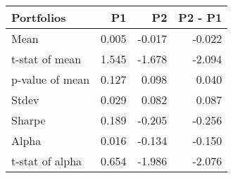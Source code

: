 \begin{tabular}{lrrr}
\toprule
Portfolios & P1 & P2 & P2 - P1 \\
\midrule
Mean & 0.005 & -0.017 & -0.022 \\
t-stat of mean & 1.545 & -1.678 & -2.094 \\
p-value of mean & 0.127 & 0.098 & 0.040 \\
Stdev & 0.029 & 0.082 & 0.087 \\
Sharpe & 0.189 & -0.205 & -0.256 \\
Alpha & 0.016 & -0.134 & -0.150 \\
t-stat of alpha & 0.654 & -1.986 & -2.076 \\
\bottomrule
\end{tabular}
